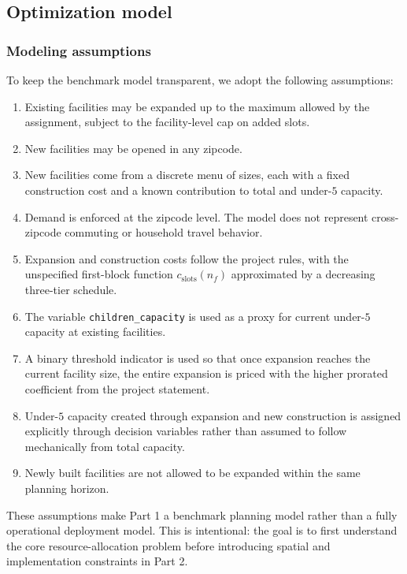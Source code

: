 \documentclass[11pt]{article}
\newcommand{\1}{\mathbb{I}}
\begin{document}
\subsection{Optimization model}

\subsubsection{Modeling assumptions}

To keep the benchmark model transparent, we adopt the following assumptions:

\begin{enumerate}
    \item Existing facilities may be expanded up to the maximum allowed by the assignment, subject to the facility-level cap on added slots.
    \item New facilities may be opened in any zipcode.
    \item New facilities come from a discrete menu of sizes, each with a fixed construction cost and a known contribution to total and under-\(5\) capacity.
    \item Demand is enforced at the zipcode level. The model does not represent cross-zipcode commuting or household travel behavior.
    \item Expansion and construction costs follow the project rules, with the unspecified first-block function \(c_{\text{slots}}(n_f)\) approximated by a decreasing three-tier schedule.
    \item The variable \texttt{children\_capacity} is used as a proxy for current under-\(5\) capacity at existing facilities.
    \item A binary threshold indicator is used so that once expansion reaches the current facility size, the entire expansion is priced with the higher prorated coefficient from the project statement.
    \item Under-\(5\) capacity created through expansion and new construction is assigned explicitly through decision variables rather than assumed to follow mechanically from total capacity.
    \item Newly built facilities are not allowed to be expanded within the same planning horizon. 
\end{enumerate}

These assumptions make Part 1 a benchmark planning model rather than a fully operational deployment model. This is intentional: the goal is to first understand the core resource-allocation problem before introducing spatial and implementation constraints in Part 2.
\end{document}
